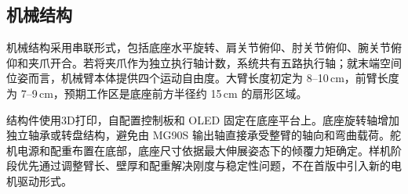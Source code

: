 \subsection{机械结构}

机械结构采用串联形式，包括底座水平旋转、肩关节俯仰、肘关节俯仰、腕关节俯仰和夹爪开合。若将夹爪作为独立执行轴计数，系统共有五路执行轴；就末端空间位姿而言，机械臂本体提供四个运动自由度。大臂长度初定为 8--10\,cm，前臂长度为 7--9\,cm，预期工作区是底座前方半径约 15\,cm 的扇形区域。

结构件使用3D打印，自配置控制板和 OLED 固定在底座平台上。底座旋转轴增加独立轴承或转盘结构，避免由 MG90S 输出轴直接承受整臂的轴向和弯曲载荷。舵机电源和配重布置在底部，底座尺寸依据最大伸展姿态下的倾覆力矩确定。样机阶段优先通过调整臂长、壁厚和配重解决刚度与稳定性问题，不在首版中引入新的电机驱动形式。

